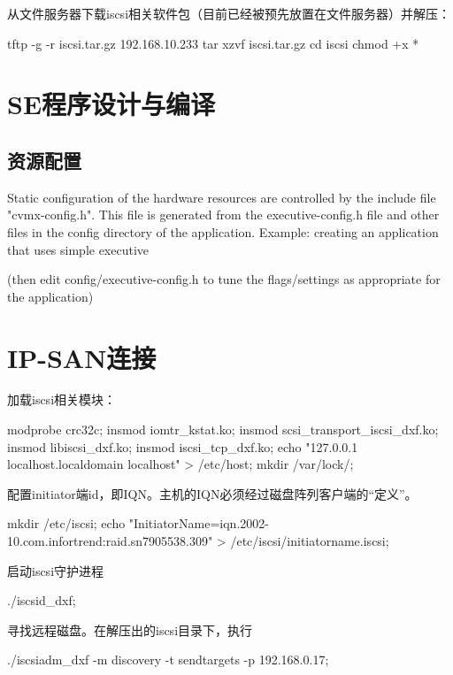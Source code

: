从文件服务器下载iscsi相关软件包（目前已经被预先放置在文件服务器）并解压：
\begin{shellcmd}
tftp -g -r iscsi.tar.gz 192.168.10.233
tar xzvf iscsi.tar.gz
cd iscsi
chmod +x *
\end{shellcmd}

\section{SE程序设计与编译}
\subsection{资源配置}
Static configuration of the hardware resources are controlled by the include file "cvmx-config.h". This file is generated from the executive-config.h file and other files in the config directory of the application. 
Example: creating an application that uses simple executive
\begin{shellcmd}
\end{shellcmd}
(then edit config/executive-config.h to tune the flags/settings as appropriate for the application)
\section{IP-SAN连接}
加载iscsi相关模块：
\begin{shellcmd}
modprobe crc32c;
insmod iomtr_kstat.ko;
insmod scsi_transport_iscsi_dxf.ko;
insmod libiscsi_dxf.ko;
insmod iscsi_tcp_dxf.ko;
echo "127.0.0.1       localhost.localdomain   localhost" > /etc/host;
mkdir /var/lock/;
\end{shellcmd}

配置initiator端id，即IQN。主机的IQN必须经过磁盘阵列客户端的“定义”。
\begin{shellcmd}
mkdir /etc/iscsi;
echo "InitiatorName=iqn.2002-10.com.infortrend:raid.sn7905538.309" > /etc/iscsi/initiatorname.iscsi;
\end{shellcmd}

启动iscsi守护进程
\begin{shellcmd}
./iscsid_dxf;
\end{shellcmd}

寻找远程磁盘。在解压出的iscsi目录下，执行
\begin{shellcmd}
./iscsiadm_dxf -m discovery -t sendtargets -p 192.168.0.17;
\end{shellcmd}

